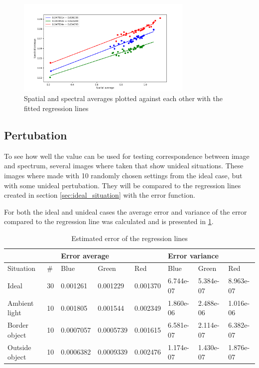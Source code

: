 \begin{figure}[h]
    \centering
    \includegraphics[width=0.75\textwidth]{Plots/spectral_vs_spatial_average_with_regression.png}
    \caption{Spatial and spectral averages plotted against each other with the fitted regression lines}
    \label{fig:spectral_vs_spatial_values}
\end{figure}

\subsection{Pertubation}
To see how well the value can be used for testing correspondence between image and spectrum, several images where taken that show unideal situations. These images where made with 10 randomly chosen settings from the ideal case, but with some unideal pertubation. They will be compared to the regression lines created in section \ref{sec:ideal_situation} with the error function. 

For both the ideal and unideal cases the average error and variance of the error compared to the regression line was calculated and is presented in \ref{tb:error_estimate}.

\begin{table}[h]
    \centering
    \caption{Estimated error of the regression lines}
    \label{tb:error_estimate}
    \begin{tabular}{@{}llllllll@{}}
    \toprule
                   &                 & \multicolumn{3}{l}{Error average} & \multicolumn{3}{l}{Error variance} \\ \midrule
    Situation      & \#              & Blue       & Green     & Red      & Blue       & Green     & Red       \\
    Ideal          & 30              & 0.001261   & 0.001229  & 0.001370 & 6.744e-07  & 5.384e-07 & 8.963e-07 \\
    Ambient light  & 10              & 0.001805   & 0.001544  & 0.002349 & 1.860e-06  & 2.488e-06 & 1.016e-06 \\
    Border object  & 10              & 0.0007057  & 0.0005739 & 0.001615 & 6.581e-07  & 2.114e-07 & 6.382e-07 \\
    Outside object & 10              & 0.0006382  & 0.0009339 & 0.002476 & 1.174e-07  & 1.430e-07 & 1.876e-07 \\ \bottomrule
    \end{tabular}
\end{table}


